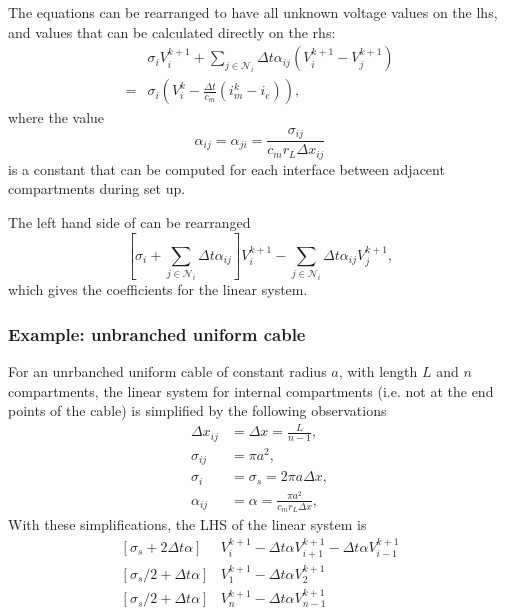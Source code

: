 The equations can be rearranged to have all unknown voltage values on the lhs, and values that can be calculated directly on the rhs:
\begin{align}
      & \sigma_i V_i^{k+1} + \sum_{j\in\mathcal{N}_i} {\Delta t \alpha_{ij} (V_i^{k+1}-V_j^{k+1})}
            \nonumber \\
    = & \sigma_i \left( V_i^k - \frac{\Delta t}{c_m}(i_m^{k} - i_e) \right),
    \label{eq:ode_linsys}
\end{align}
where the value
\begin{equation}
    \alpha_{ij} = \alpha_{ji} = \frac{\sigma_{ij}}{ c_m r_L \Delta x_{ij}}
    \label{eq:alpha_linsys}
\end{equation}
is a constant that can be computed for each interface between adjacent compartments during set up.

The left hand side of  can be rearranged
\begin{equation}
    \left[ \sigma_i + \sum_{j\in\mathcal{N}_i} {\Delta t \alpha_{ij}} \right] V_i^{k+1}
    - \sum_{j\in\mathcal{N}_i} { \Delta t \alpha_{ij} V_j^{k+1}},
\end{equation}
which gives the coefficients for the linear system.

\subsubsection{Example: unbranched uniform cable}
For an unrbanched uniform cable of constant radius $a$, with length $L$ and $n$ compartments, the linear system for internal compartments (i.e. not at the end points of the cable) is simplified by the following observations
\begin{align}
    \Delta x_{ij} &= \Delta x = \frac{L}{n-1}, \nonumber \\
    \sigma_{ij}   &= \pi a^2, \nonumber \\
    \sigma_{i}    &= \sigma_s = 2 \pi a \Delta x, \nonumber \\
    \alpha_{ij}   &= \alpha = \frac{\pi a^2}{c_m r_L\Delta x}, \nonumber
\end{align}
With these simplifications, the LHS of the linear system is
\begin{align}
    \left[\sigma_s + 2\Delta t\alpha\right] & V_{i}^{k+1}
    - \Delta t \alpha V_{i+1}^{k+1}
    - \Delta t \alpha V_{i-1}^{k+1}
        \nonumber \\
    \left[\sigma_s/2 + \Delta t\alpha\right] & V_{1}^{k+1}
    - \Delta t \alpha V_{2}^{k+1}
        \nonumber \\
    \left[\sigma_s/2 + \Delta t\alpha\right] & V_{n}^{k+1}
    - \Delta t \alpha V_{n-1}^{k+1}
        \nonumber
\end{align}


